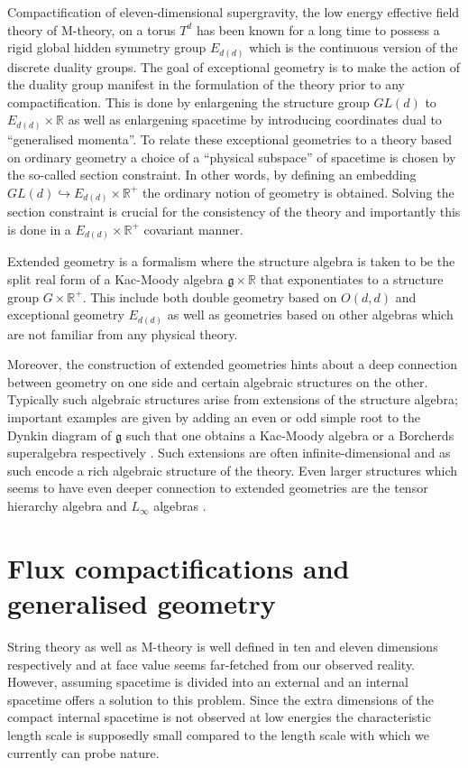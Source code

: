 Compactification of eleven-dimensional supergravity, the low energy effective field theory of M-theory, on a torus $T^d$ has been known for a long time to possess a rigid global hidden symmetry group $E_{d(d)}$\cite{CREMMER197848,Cremmer:1979up,Cremmer:1997ct} which is the continuous version of the discrete duality groups. The goal of exceptional geometry is to make the action of the duality group manifest in the formulation of the theory prior to any compactification. This is done by enlargening the structure group $GL(d)$ to $E_{d(d)}\times\mathbb{R}$ as well as enlargening spacetime by introducing coordinates dual to ``generalised momenta''. To relate these exceptional geometries to a theory based on ordinary geometry a choice of a ``physical subspace'' of spacetime is chosen by the so-called section constraint. In other words, by defining an embedding $GL(d)\hookrightarrow E_{d(d)}\times\mathbb{R}^+$ the ordinary notion of geometry is obtained. Solving the section constraint is crucial for the consistency of the theory and importantly this is done in a $E_{d(d)}\times\mathbb{R}^+$ covariant manner. 

Extended geometry \cite{CederwallPalmkvist2017} is a formalism where the structure algebra is taken to be the split real form of a Kac-Moody algebra $\mathfrak{g}\times\mathbb{R}$ that exponentiates to a structure group $G\times \mathbb{R}^+$. This include both double geometry based on $O(d,d)$ and exceptional geometry $E_{d(d)}$ as well as geometries based on other algebras which are not familiar from any physical theory. 

Moreover, the construction of extended geometries hints about a deep connection between geometry on one side and certain algebraic structures on the other. Typically such algebraic structures arise from extensions of the structure algebra; important examples are given by adding an even or odd simple root to the Dynkin diagram of $\mathfrak{g}$ such that one obtains a Kac-Moody algebra or a Borcherds superalgebra respectively \cite{Palmkvist2015ExpGeomSuperAlg,CederwallPalmkvistSuperalgebras2015}. Such extensions are often infinite-dimensional and as such encode a rich algebraic structure of the theory. Even larger structures which seems to have even deeper connection to extended geometries are the tensor hierarchy algebra \cite{Palmkvist:2013vya,Carbone:2018njd} and $L_\infty$ algebras \cite{Cederwall:2018aab,Hohm:2017pnh}.


\section{Flux compactifications and generalised geometry}
String theory as well as M-theory is well defined in ten and eleven dimensions respectively and at face value seems far-fetched from our observed reality. However, assuming spacetime is divided into an external and an internal spacetime offers a solution to this problem. Since the extra dimensions of the compact internal spacetime is not observed at low energies the characteristic length scale is supposedly small compared to the length scale with which we currently can probe nature.

